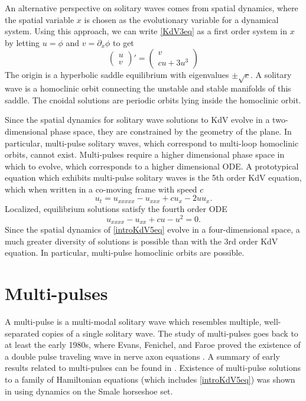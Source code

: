 \documentclass[thesis2.tex]{subfiles}
\begin{document}
An alternative perspective on solitary waves comes from spatial dynamics, where the spatial variable $x$ is chosen as the evolutionary variable for a dynamical system. Using this approach, we can write \cref{KdV3eq} as a first order system in $x$ by letting $u = \phi$ and $v = \partial_x \phi$ to get
\begin{equation}\label{KdV3sd}
\begin{pmatrix}u \\ v
\end{pmatrix}'
= \begin{pmatrix}
v \\ c u + 3 u^3
\end{pmatrix}
\end{equation}
The origin is a hyperbolic saddle equilibrium with eigenvalues $\pm \sqrt{c}$. A solitary wave is a homoclinic orbit connecting the unstable and stable manifolds of this saddle. The cnoidal solutions are periodic orbits lying inside the homoclinic orbit.

Since the spatial dynamics for solitary wave solutions to KdV evolve in a two-dimensional phase space, they are constrained by the geometry of the plane. In particular, multi-pulse solitary waves, which correspond to multi-loop homoclinic orbits, cannot exist. Multi-pulses require a higher dimensional phase space in which to evolve, which corresponds to a higher dimensional ODE. A prototypical equation which exhibits multi-pulse solitary waves is the 5th order KdV equation, which when written in a co-moving frame with speed $c$ 
\begin{equation}\label{introKdV5}
u_t = u_{xxxxx} - u_{xxx} + c u_x - 2 u u_x .
\end{equation}
Localized, equilibrium solutions satisfy the fourth order ODE
\begin{equation}\label{introKdV5eq}
u_{xxxx} - u_{xx} + c u - u^2 = 0.
\end{equation}
Since the spatial dynamics of \cref{introKdV5eq} evolve in a four-dimensional space, a much greater diversity of solutions is possible than with the 3rd order KdV equation. In particular, multi-pulse homoclinic orbits are possible.

\section{Multi-pulses}

A multi-pulse is a multi-modal solitary wave which resembles multiple, well-separated copies of a single solitary wave. The study of multi-pulses goes back to at least the early 1980s, where Evans, Fenichel, and Faroe proved the existence of a double pulse traveling wave in nerve axon equations \cite{Evans1982}. A summary of early results related to multi-pulses can be found in \cite[Section 1]{Sandstede1998}. Existence of multi-pulse solutions to a family of Hamiltonian equations (which includes \cref{introKdV5eq}) was shown in \cite{Buffoni1996} using dynamics on the Smale horseshoe set. 
\end{document}
